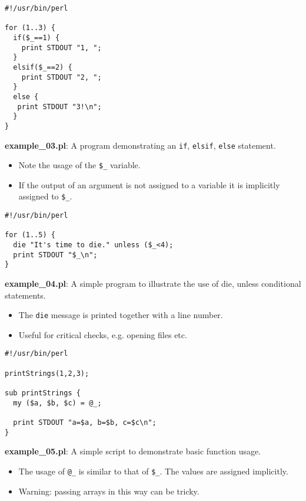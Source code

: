 \documentclass[17pt,dvips]{foils}
\begin{document}

\begin{verbatim}
#!/usr/bin/perl

for (1..3) {
  if($_==1) {
    print STDOUT "1, ";
  }
  elsif($_==2) {
    print STDOUT "2, ";
  }
  else {
   print STDOUT "3!\n";
  }
}
\end{verbatim}
{\bf example\_03.pl}: A program demonstrating an \texttt{if}, \texttt{elsif}, 
\texttt{else} statement.

\begin{itemize}
\item Note the usage of the \texttt{\$\_} variable.
\item If the output of an argument is not assigned to a variable it is
implicitly assigned to \texttt{\$\_}.
\end{itemize}


\begin{verbatim}
#!/usr/bin/perl

for (1..5) {
  die "It's time to die." unless ($_<4);
  print STDOUT "$_\n";
}
\end{verbatim}
{\bf example\_04.pl}: A simple program to illustrate the use of die, unless
conditional statements.

\begin{itemize}
\item The \texttt{die} message is printed together with a line number.
\item Useful for critical checks, e.g. opening files etc.
\end{itemize}


\begin{verbatim}
#!/usr/bin/perl

printStrings(1,2,3);

sub printStrings {
  my ($a, $b, $c) = @_;
  
  print STDOUT "a=$a, b=$b, c=$c\n";
}
\end{verbatim}
{\bf example\_05.pl}: A simple script to demonstrate basic function usage.

\begin{itemize}
\item The usage of \texttt{@\_} is similar to that of \texttt{\$\_}.
The values are assigned implicitly.
\item Warning: passing arrays in this way can be tricky.
\end{itemize}
\end{document}
